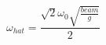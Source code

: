 \begin{equation} \label{eq:omega0_hat_equation}
\omega_{hat} = \frac{\sqrt{2} \omega_{0} \sqrt{\frac{beam}{g}}}{2}
\end{equation}
